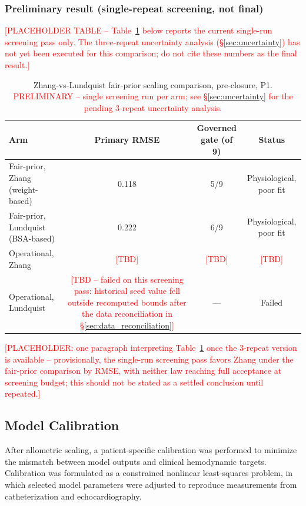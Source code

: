 \documentclass{article}
\begin{document}
\subsubsection{Preliminary result (single-repeat screening, not final)}

\textcolor{red}{[PLACEHOLDER TABLE -- Table~\ref{tab:scaling_comparison} below reports the current single-run screening pass only. The three-repeat uncertainty analysis (\S\ref{sec:uncertainty}) has not yet been executed for this comparison; do not cite these numbers as the final result.]}

\begin{table}[ht]
\centering
\caption{Zhang-vs-Lundquist fair-prior scaling comparison, pre-closure, P1. \textcolor{red}{PRELIMINARY -- single screening run per arm; see \S\ref{sec:uncertainty} for the pending 3-repeat uncertainty analysis.}}
\label{tab:scaling_comparison}
\begin{tabular}{lccc}
\toprule
\textbf{Arm} & \textbf{Primary RMSE} & \textbf{Governed gate (of 9)} & \textbf{Status} \\
\midrule
Fair-prior, Zhang (weight-based) & 0.118 & 5/9 & Physiological, poor fit \\
Fair-prior, Lundquist (BSA-based) & 0.222 & 6/9 & Physiological, poor fit \\
Operational, Zhang & \textcolor{red}{[TBD]} & \textcolor{red}{[TBD]} & \textcolor{red}{[TBD]} \\
Operational, Lundquist & \textcolor{red}{[TBD -- failed on this screening pass: historical seed value fell outside recomputed bounds after the data reconciliation in \S\ref{sec:data_reconciliation}]} & --- & Failed \\
\bottomrule
\end{tabular}
\end{table}

\textcolor{red}{[PLACEHOLDER: one paragraph interpreting Table~\ref{tab:scaling_comparison} once the 3-repeat version is available -- provisionally, the single-run screening pass favors Zhang under the fair-prior comparison by RMSE, with neither law reaching full acceptance at screening budget; this should not be stated as a settled conclusion until repeated.]}

\subsection{Model Calibration}
\label{sec:calibration}

After allometric scaling, a patient-specific calibration was performed to minimize the mismatch between model outputs and clinical hemodynamic targets. Calibration was formulated as a constrained nonlinear least-squares problem, in which selected model parameters were adjusted to reproduce measurements from catheterization and echocardiography.
\end{document}
